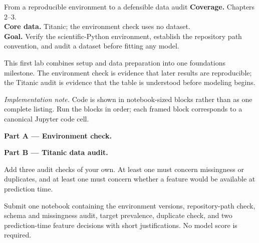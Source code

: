 
\begin{labproject}{From a reproducible environment to a defensible data audit}
\textbf{Coverage.} Chapters 2--3.\\
\textbf{Core data.} Titanic; the environment check uses no dataset.\\
\textbf{Goal.} Verify the scientific-Python environment, establish the repository path convention, and audit a dataset before fitting any model.

\begin{labmode}
This first lab combines setup and data preparation into one foundations milestone. The environment check is evidence that later results are reproducible; the Titanic audit is evidence that the table is understood before modeling begins.
\end{labmode}

\smallskip\noindent\textit{Implementation note.} Code is shown in notebook-sized blocks rather than as one complete listing. Run the blocks in order; each framed block corresponds to a canonical Jupyter code cell.\par

\medskip\noindent\textbf{Part A --- Environment check.}\par



\medskip\noindent\textbf{Part B --- Titanic data audit.}\par





\begin{tryit}
Add three audit checks of your own. At least one must concern missingness or duplicates, and at least one must concern whether a feature would be available at prediction time.
\end{tryit}
\end{labproject}

\begin{labdeliverable}
Submit one notebook containing the environment versions, repository-path check, schema and missingness audit, target prevalence, duplicate check, and two prediction-time feature decisions with short justifications. No model score is required.
\end{labdeliverable}
